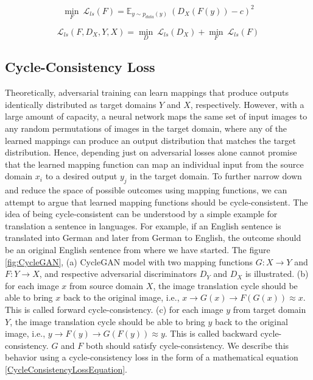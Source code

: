     \begin{equation}\label{lsgan5}        
        \underset{F}{\min}\ \mathcal{L}_{ls}(F) = \mathbb{E}_{y \sim p_{data}(y)}\ (D_X(F(y)) - c)^2
    \end{equation}
    
    
    \begin{equation}\label{lsgan6}        
        \mathcal{L}_{ls}(F, D_X, Y, X) = \underset{D}{\min}\ \mathcal{L}_{ls}(D_X) + \underset{F}{\min}\ \mathcal{L}_{ls}(F)
    \end{equation}
    

\subsection{Cycle-Consistency Loss}\label{CycleConsistencyLoss}

Theoretically, adversarial training can learn mappings that produce outputs identically distributed as target domains $Y$ and $X$, respectively. However, with a large amount of capacity, a neural network maps the same set of input images to any random permutations of images in the target domain,  where any of the learned mappings can produce an output distribution that matches the target distribution. Hence, depending just on adversarial losses alone cannot promise that the learned mapping function can map an individual input from the source domain $x_i$ to a desired output $y_j$ in the target domain. 
To further narrow down and reduce the space of possible outcomes using mapping functions, we can attempt to argue that learned mapping functions should be cycle-consistent. The idea of being cycle-consistent can be understood by a simple example for translation a sentence in languages. For example, if an English sentence is translated into German and later from German to English, the outcome should be an original English sentence from where we have started. The figure \ref{fig:CycleGAN}, (a) \ac{CycleGAN} model with two mapping functions $G : X \rightarrow Y$ and $F : Y \rightarrow X$, and respective adversarial discriminators $D_Y$ and $D_X$ is illustrated. (b) for each image $x$ from source domain $X$, the image translation cycle should be able to bring $x$ back to the original image, i.e., $x \rightarrow G(x) \rightarrow F(G(x)) \approx x$. This is called forward cycle-consistency. (c) for each image $y$ from target domain $Y$, the image translation cycle should be able to bring $y$ back to the original image, i.e., $y \rightarrow F(y) \rightarrow G(F(y)) \approx y$. This is called backward cycle-consistency. $G$ and $F$ both should satisfy cycle-consistency. We describe this behavior using a cycle-consistency loss in the form of a mathematical equation \ref{CycleConsistencyLossEquation}.

